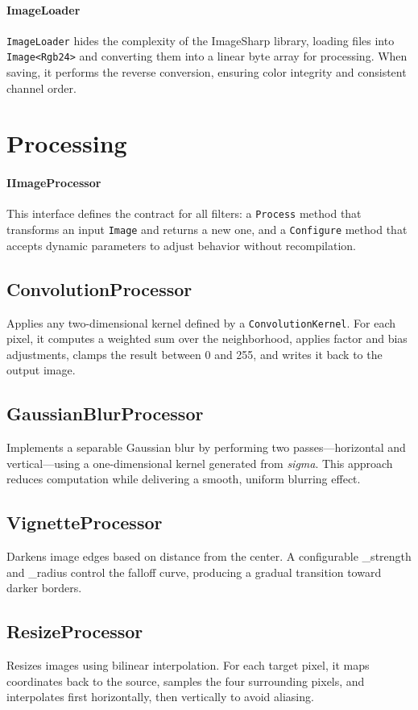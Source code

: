 \documentclass[12pt,a4paper]{report}
\begin{document}
\paragraph{ImageLoader}
\texttt{ImageLoader} hides the complexity of the ImageSharp library, loading files into \texttt{Image<Rgb24>} and converting them into a linear byte array for processing. When saving, it performs the reverse conversion, ensuring color integrity and consistent channel order.

\section{Processing}

\paragraph{IImageProcessor}
This interface defines the contract for all filters: a \texttt{Process} method that transforms an input \texttt{Image} and returns a new one, and a \texttt{Configure} method that accepts dynamic parameters to adjust behavior without recompilation.

\subsection{ConvolutionProcessor}
Applies any two-dimensional kernel defined by a \texttt{ConvolutionKernel}. For each pixel, it computes a weighted sum over the neighborhood, applies factor and bias adjustments, clamps the result between 0 and 255, and writes it back to the output image.

\subsection{GaussianBlurProcessor}
Implements a separable Gaussian blur by performing two passes—horizontal and vertical—using a one-dimensional kernel generated from \textit{sigma}. This approach reduces computation while delivering a smooth, uniform blurring effect.

\subsection{VignetteProcessor}
Darkens image edges based on distance from the center. A configurable \_strength and \_radius control the falloff curve, producing a gradual transition toward darker borders.

\subsection{ResizeProcessor}
Resizes images using bilinear interpolation. For each target pixel, it maps coordinates back to the source, samples the four surrounding pixels, and interpolates first horizontally, then vertically to avoid aliasing.
\end{document}
